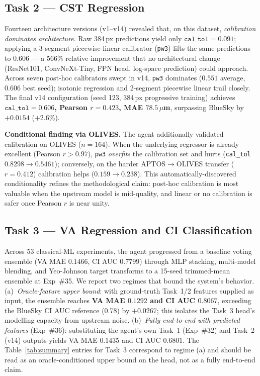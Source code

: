 \documentclass{article}
\begin{document}
\subsection{Task 2 — CST Regression}
Fourteen architecture versions (v1--v14) revealed that, on this dataset, \emph{calibration dominates architecture}. Raw 384\,px predictions yield only $\texttt{cal\_tol}{=}0.091$; applying a 3-segment piecewise-linear calibrator (\texttt{pw3}) lifts the same predictions to $0.606$ — a $566\%$ relative improvement that no architectural change (ResNet101, ConvNeXt-Tiny, FPN head, log-space prediction) could approach. Across seven post-hoc calibrators swept in v14, \texttt{pw3} dominates ($0.551$ average, $0.606$ best seed); isotonic regression and 2-segment piecewise linear trail closely. The final v14 configuration (seed 123, 384\,px progressive training) achieves \textbf{$\texttt{cal\_tol}{=}0.606$, Pearson $r{=}0.423$, MAE $78.5\,\mu$m}, surpassing BlueSky by $+0.0154$ ($+2.6\%$).

\textbf{Conditional finding via OLIVES.} The agent additionally validated calibration on OLIVES ($n{=}164$). When the underlying regressor is already excellent (Pearson $r{>}0.97$), \texttt{pw3} \emph{overfits} the calibration set and hurts (\texttt{cal\_tol} $0.8298\!\to\!0.5461$); conversely, on the harder APTOS$\to$OLIVES transfer ($r{=}0.412$) calibration helps ($0.159\!\to\!0.238$). This automatically-discovered conditionality refines the methodological claim: post-hoc calibration is most valuable when the upstream model is mid-quality, and linear or no calibration is safer once Pearson $r$ is near unity.

\subsection{Task 3 — VA Regression and CI Classification}
Across 53 classical-ML experiments, the agent progressed from a baseline voting ensemble (VA MAE $0.1466$, CI AUC $0.7799$) through MLP stacking, multi-model blending, and Yeo-Johnson target transforms to a 15-seed trimmed-mean ensemble at Exp~\#35. We report two regimes that bound the system's behavior. (a)~\emph{Oracle-feature upper bound}: with ground-truth Task~1/2 features supplied as input, the ensemble reaches \textbf{VA MAE $0.1292$ and CI AUC $0.8067$}, exceeding the BlueSky CI AUC reference (0.78) by $+0.0267$; this isolates the Task~3 head's modelling capacity from upstream noise. (b)~\emph{Fully end-to-end with predicted features} (Exp~\#36): substituting the agent's own Task~1 (Exp~\#32) and Task~2 (v14) outputs yields VA MAE $0.1435$ and CI AUC $0.6801$. The Table~\ref{tab:summary} entries for Task~3 correspond to regime (a) and should be read as an oracle-conditioned upper bound on the head, not as a fully end-to-end claim.
\end{document}
